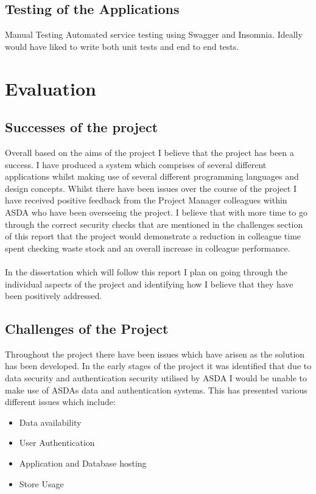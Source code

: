 \documentclass[a4paper,11pt]{report}
\begin{document}
\section{Testing of the Applications}
Manual Testing
Automated service testing using Swagger and Insomnia.
Ideally would have liked to write both unit tests and end to end tests.

\chapter{Evaluation}
\section {Successes of the project}
Overall based on the aims of the project I believe that the project has been a success. I have produced a system which comprises of several different applications whilst making use of several different programming languages and design concepts. 
 Whilst there have been issues over the course of the project I have received positive feedback from the Project Manager colleagues within ASDA who have been overseeing the project.
I believe that with more time to go through the correct security checks that are mentioned in the challenges section of this report that the project would demonstrate a reduction in 
colleague time spent checking waste stock and an overall increase in colleague performance. 
\\
\\
In the dissertation which will follow this report I plan on going through the individual aspects of the project and identifying how I believe that they have been positively addressed.

\section {Challenges of the Project}
Throughout the project there have been issues which have arisen as the solution has been developed. In the early stages of the project it was identified that due to data security and authentication security utilised by ASDA I would be unable to make use of ASDAs data and authentication systems. This has presented various different issues which include:
\begin{itemize}
    \item Data availability
    \item User Authentication
    \item Application and Database hosting
    \item Store Usage
\end{itemize}
\end{document}
